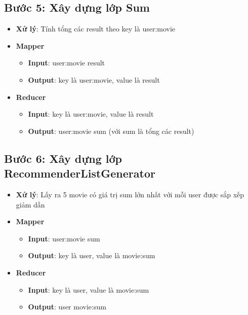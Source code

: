\documentclass{report}
\begin{document}
\subsection*{Bước 5: Xây dựng lớp Sum}
\begin{itemize}
    \item \textbf{Xử lý}: Tính tổng các result theo key là user:movie
    \item \textbf{Mapper}
          \begin{itemize}
              \item \textbf{Input}: user:movie \quad result \\
              \item \textbf{Output}: key là user:movie, value là result \\
          \end{itemize}
    \item \textbf{Reducer}
          \begin{itemize}
              \item \textbf{Input}: key là user:movie, value là result \\
              \item \textbf{Output}: user:movie \quad sum (với sum là tổng các result) \\
          \end{itemize}
\end{itemize}
\subsection*{Bước 6: Xây dựng lớp RecommenderListGenerator}
\begin{itemize}
    \item \textbf{Xử lý}: Lấy ra 5 movie có giá trị sum lớn nhất với mỗi user được sắp xếp giảm dần
    \item \textbf{Mapper}
          \begin{itemize}
              \item \textbf{Input}: user:movie \quad sum \\
              \item \textbf{Output}: key là user, value là movie:sum \\
          \end{itemize}
    \item \textbf{Reducer}
          \begin{itemize}
              \item \textbf{Input}: key là user, value là movie:sum \\
              \item \textbf{Output}: user \quad movie:sum
          \end{itemize}
\end{itemize}
\end{document}
